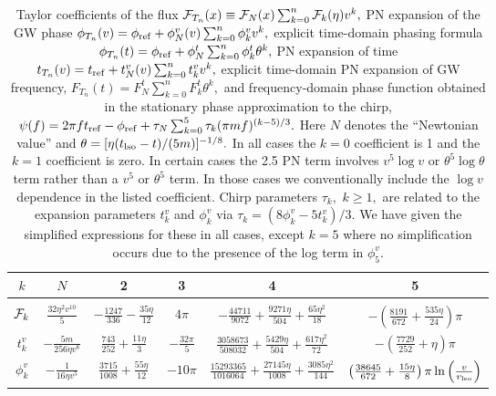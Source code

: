 \begin {table}[h]
\caption {Taylor coefficients of the flux 
${\cal F}_{T_n}(x) \equiv {\cal F}_N(x) \sum_{k=0}^n {{\cal F}}_k(\eta)v^k,$
PN expansion of the GW phase
$\phi_{T_n}(v) =  \phi_{\rm ref} + \phi^v_N (v)\sum_{k=0}^{n} {\phi}^v_k v^k,$
explicit time-domain phasing formula
$\phi_{T_n}(t) = \phi_{\rm ref}+\phi_N^t \sum_{k=0}^{n} 
{\phi}^t_k\theta^k,$
PN expansion of time $t_{T_n}(v) = t_{\rm ref} +t^v_N(v) \sum_{k=0}^{n} {t}^v_k v^k,$ 
explicit time-domain PN expansion of GW frequency,
$F_{T_n}(t) =  F_N^t \sum_{k=0}^{n} {F}^t_k \theta^k,$
and frequency-domain phase function obtained in the stationary phase approximation
to the chirp,
$\psi(f) = 2 \pi f t_{\rm ref} - \phi_{\rm ref} + 
\tau_N \sum_{k=0}^5 {\tau}_k (\pi m f)^{(k-5)/3}.$
Here $N$ denotes the ``Newtonian value'' and 
$\theta=[\eta (t_{\rm lso}-t)/(5m)]^{-1/8}.$ In all cases the $k=0$ coefficient
is 1 and the  $k=1$ coefficient is zero. In certain cases
the 2.5 PN term involves $v^5 \log v$ or $\theta^5 \log \theta$
 term rather than a  $v^5$ or $\theta^5$ term.  
In those cases  we conventionally include the $\log v$ dependence in the
listed coefficient.
Chirp parameters $\tau_k,$ $k\ge 1,$
are related to the expansion parameters $t^v_k$ and $\phi^v_k$ via
$\tau_k = ( 8 \phi^v_k - 5 t^v_k )/3.$ 
We have given the simplified 
expressions for these in all cases, except $k=5$ where no simplification occurs
due to the presence of the log term in $\phi^v_5.$}
\begin {center}
\begin {tabular}{cccccc}
\hline
$k$ &  $N$ & 2  &  3  &  4  &  5  \\
\hline\\[-8pt]
${\cal F}_k$ 
      & $\frac{32\eta^2 v^{10}}{5}$
      & $- \frac{1247}{336} - \frac{35\eta}{12}$
    & $4\pi$
    & $-\frac{44711}{9072} + \frac{9271\eta}{504} + \frac{65\eta^2}{18}$
    & $-\left(\frac{8191}{672} + \frac{535\eta}{24}\right) \pi$\\[3pt]
$t^v_k$
      & $-\frac{5m}{256 \eta v^8}$
      & $\frac{743}{252} + \frac{11\eta}{3}$
      & $-\frac{32\pi}{5}$
      & $\frac{3058673}{508032} + \frac{5429\eta}{504} + \frac{617\eta^2}{72}$
      & $-\left(\frac{7729}{252}+ \eta\right)\pi$\\[3pt]
$\phi^v_k$
      & $-\frac{1}{16\eta v^5}$
      & $\frac{3715}{1008}+\frac{55\eta}{12}$
      & $-10 \pi$
      & $\frac{15293365}{1016064} + \frac{27145\eta}{1008 } + 
\frac{3085\eta^2}{144}$
      & $ \left (\frac{38645}{672} + \frac{15\eta}{8 } \right ) \pi 
\ln \left ( \frac{v}{v_{\rm lso}} \right ) $\\[3pt]

\end{tabular}
\end{center}
\end{table}
